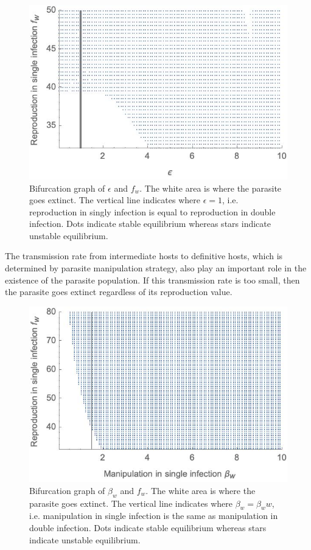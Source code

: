 \documentclass{article}
\begin{document}
\begin{figure}
\includegraphics[width = \textwidth]{Figures/bifurcation_epsilonfw_NL.jpg}
\caption{Bifurcation graph of $\epsilon$ and $f_w$. The white area is where the parasite goes extinct. The vertical line indicates where $\epsilon = 1$, i.e. reproduction in singly infection is equal to reproduction in double infection. Dots indicate stable equilibrium whereas stars indicate unstable equilibrium.}
\end{figure}

The transmission rate from intermediate hosts to definitive hosts, which is determined by parasite manipulation strategy, also play an important role in the existence of the parasite population. If this transmission rate is too small, then the parasite goes extinct regardless of its reproduction value.

\begin{figure}
\includegraphics[width=\textwidth]{Figures/bifurcation_betawfw_NL.jpg}
\caption{Bifurcation graph of $\beta_w$ and $f_w$. The white area is where the parasite goes extinct. The vertical line indicates where $\beta_w = \beta_ww$, i.e. manipulation in single infection is the same as manipulation in double infection. Dots indicate stable equilibrium whereas stars indicate unstable equilibrium.}
\end{figure}
\end{document}
